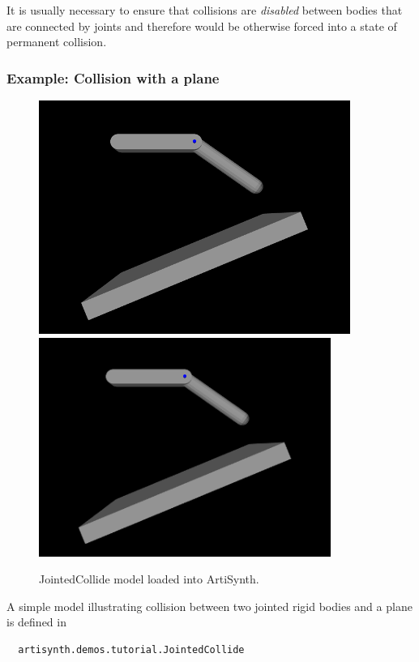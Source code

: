 \begin{sideblock}
It is usually necessary to ensure that collisions are {\it disabled}
between bodies that are connected by joints and therefore would be
otherwise forced into a state of permanent collision.
\end{sideblock}

\subsubsection{Example: Collision with a plane}

\begin{figure}[h]
\begin{center}
\iflatexml
 \includegraphics[]{images/JointedCollide}
\else
 \includegraphics[width=3.75in]{images/JointedCollide}
\fi
\end{center}
\caption{JointedCollide model loaded into ArtiSynth.}
\label{JointedCollide:fig}
\end{figure}

A simple model illustrating collision between two jointed rigid bodies
and a plane is defined in
%
\begin{verbatim}
  artisynth.demos.tutorial.JointedCollide
\end{verbatim}
%

